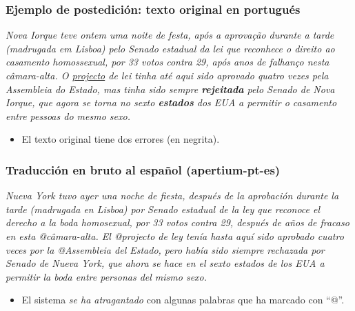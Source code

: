 \documentclass{beamer}
\newcommand{\empha}[1]{\emph{#1}\/}
\begin{document}

\begin{frame}
  \frametitle{Ejemplo de postedición: texto original en portugués} 

  \empha{Nova Iorque teve ontem uma noite de festa, após a aprovação
    durante a tarde (madrugada em Lisboa) pelo Senado estadual da lei
    que reconhece o direito ao casamento homossexual, por 33 votos
    contra 29, após anos de falhanço nesta câmara-alta.  O
    \underline{projecto} de lei tinha até aqui sido aprovado quatro
    vezes pela Assembleia do Estado, mas tinha sido sempre
    \textbf{rejeitada} pelo Senado de Nova Iorque, que agora se torna
    no sexto \textbf{estados} dos EUA a permitir o casamento entre
    pessoas do mesmo sexo.}

  \begin{itemize}
  \item El texto original tiene dos errores (en negrita).
  \end{itemize}

\end{frame}



\begin{frame}
  \frametitle{Traducción en bruto al español (apertium-pt-es)}

  \empha{Nueva York tuvo ayer una noche de fiesta, después de la
    aprobación durante la tarde (madrugada en Lisboa) por Senado
    estadual de la ley que reconoce el derecho a la boda homosexual,
    por 33 votos contra 29, después de años de fracaso en esta
    @câmara-alta.  El @projecto de ley tenía hasta aquí sido aprobado
    cuatro veces por la @Assembleia del Estado, pero había sido
    siempre rechazada por Senado de Nueva York, que ahora se hace en
    el sexto estados de los EUA a permitir la boda entre personas del
    mismo sexo.}


  \begin{itemize}
  \item El sistema \emph{se ha atragantado} con algunas palabras que ha marcado con ``@''.
  \end{itemize}
\end{frame}
\end{document}
